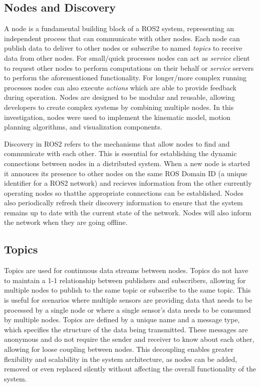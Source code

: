 \documentclass[10pt,a4paper,english]{article}
\begin{document}
\subsection{Nodes and Discovery}
A node is a fundamental building block of a ROS2 system, representing an independent process that can communicate with other nodes. Each node can publish data to deliver to other nodes or subscribe to named \textit{topics} to receive data from other nodes. For small/quick processes nodes can act as \textit{service} client to request other nodes to perform computations on their behalf or \textit{service} servers to perform the aforementioned functionality. For longer/more complex running processes nodes can also execute \textit{actions} which are able to provide feedback during operation. Nodes are designed to be modular and reusable, allowing developers to create complex systems by combining multiple nodes. In this investigation, nodes were used to implement the kinematic model, motion planning algorithms, and visualization components. \par
Discovery in ROS2 refers to the mechanisms that allow nodes to find and communicate with each other. This is essential for establishing the dynamic connections between nodes in a distributed system. When a new node is started it annouces its presence to other nodes on the same ROS Domain ID (a unique identifier for a ROS2 network) and recieves information from the other currently operating nodes so thatthe appropriate connections can be established. Nodes also periodically refresh their discovery information to ensure that the system remains up to date with the current state of the network. Nodes will also inform the network when they are going offline.

\subsection{Topics}
Topics are used for continuous data streams between nodes. Topics do not have to maintain a 1-1 relationship between publishers and subscribers, allowing for multiple nodes to publish to the same topic or subscribe to the same topic. This is useful for scenarios where multiple sensors are providing data that needs to be processed by a single node or where a single sensor's data needs to be consumed by multiple nodes. Topics are defined by a unique name and a message type, which specifies the structure of the data being transmitted. These messages are anonymous and do not require the sender and receiver to know about each other, allowing for loose coupling between nodes. This decoupling enables greater flexibility and scalability in the system architecture, as nodes can be added, removed or even replaced silently without affecting the overall functionality of the system.
\end{document}
